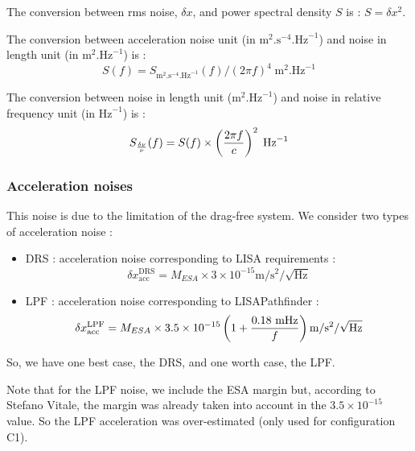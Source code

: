 \documentclass{iopart}
\begin{document}
The conversion between rms noise, $\delta x$,  and power spectral density $S$ is : $S = \delta x ^ 2$.

The conversion between acceleration noise unit (in $\textrm{m}^2.\textrm{s}^{-4}.\textrm{Hz}^{-1}$) and noise in length unit (in $\textrm{m}^2.\textrm{Hz}^{-1}$) is :
\begin{equation}
S(f) =  S_{\textrm{m}^2.\textrm{s}^{-4}.\textrm{Hz}^{-1}}(f) / (2 \pi f)^4 \;  \textrm{m}^2.\textrm{Hz}^{-1}
\end{equation}
 
The conversion between  noise in length unit ($\textrm{m}^2.\textrm{Hz}^{-1}$) and noise in relative frequency unit (in $\textrm{Hz}^{-1}$) is :
\begin{equation}
S_{\delta \nu \over \nu}(f) =  S (f) \times \left( {2 \pi f \over c } \right)^2 \;  \textrm{Hz}^{-1}
\end{equation}

 

\subsubsection{Acceleration noises}
\label{SSS:Inst:Noises:Acc}
This noise is due to the limitation of the drag-free system. 
We consider two types of acceleration noise : 
\begin{itemize}
\item DRS : acceleration noise corresponding to LISA requirements :
\begin{equation}
\delta x_{\textrm{acc}}^{\textrm{DRS}} =  M_{ESA} \times 3 \times 10^{-15}  \textrm{m}/\textrm{s}^2/\sqrt{\textrm{Hz}} 
\end{equation}

\item LPF  : acceleration noise corresponding to LISAPathfinder :
\begin{equation}
\delta x_{\textrm{acc}}^{\textrm{LPF}} = M_{ESA} \times 3.5 \times 10^{-15} \left( 1 + { 0.18 \ \textrm{mHz} \over f }  \right) \textrm{m}/\textrm{s}^2/\sqrt{\textrm{Hz}}
\end{equation}

\end{itemize}

So, we have one best case, the DRS, and one worth case, the LPF. 

Note that for the LPF noise, we include the ESA margin but, according to Stefano Vitale, the margin was already taken into account in the   $3.5 \times 10^{-15}$ value. So the LPF acceleration was over-estimated (only used for configuration C1).
\end{document}
